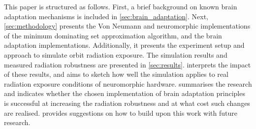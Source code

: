 This paper is structured as follows. First, a brief background on known brain adaptation mechanisms is included in \cref{sec:brain_adaptation}. Next, \cref{sec:methodology} presents the Von Neumann and neuromorphic implementations of the minimum dominating set approximation algorithm, and the brain adaptation implementations. Additionally, it presents the experiment setup and approach to simulate orbit radiation exposure. The simulation results and measured radiation robustness are presented in \cref{sec:results}.  interprets the impact of these results, and aims to sketch how well the simulation applies to real radiation exposure conditions of neuromorphic hardware.  summarises the research and indicates whether the chosen implementation of brain adaptation principles is successful at increasing the radiation robustness and at what cost such changes are realised.  provides suggestions on how to build upon this work with future research. %